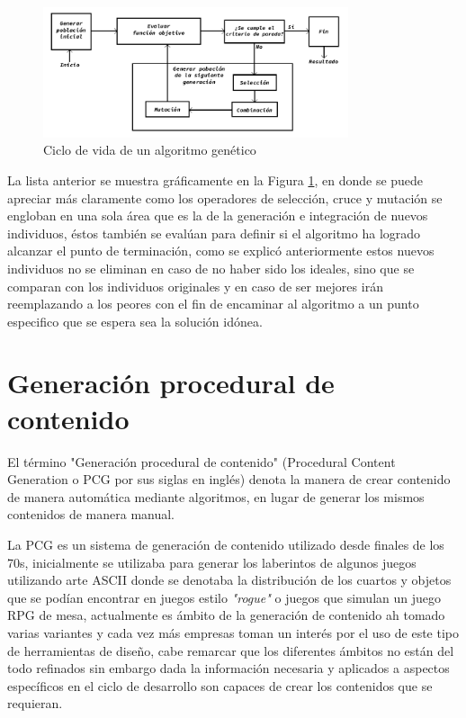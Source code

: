 \begin{figure}
    \centering
    \includegraphics[width=0.8\textwidth]{img/ga_life_cycle_es.png}
    \caption{Ciclo de vida de un algoritmo genético}
    \label{figure:GA-Cycle}
\end{figure}

La lista anterior se muestra gráficamente en la Figura \ref{figure:GA-Cycle}, en
donde se puede apreciar más claramente como los operadores de selección, cruce y
mutación se engloban en una sola área que es la de la generación e integración
de nuevos individuos, éstos  también se evalúan para definir si el algoritmo ha
logrado alcanzar el punto de terminación, como
se explicó anteriormente estos nuevos individuos no se eliminan en caso de no
haber sido los ideales, sino que se comparan con los individuos originales y en
caso de ser mejores irán reemplazando a los peores con el fin de encaminar al
algoritmo a un punto especifico que se espera sea la solución idónea.

\section{Generación procedural de contenido}
\label{section:PCG}

El término "Generación procedural de contenido" (Procedural Content Generation o
PCG por sus siglas en inglés) denota la manera de crear contenido de manera
automática mediante algoritmos, en lugar de generar los mismos contenidos de
manera manual. %


La PCG es un sistema de generación de contenido utilizado desde finales de los
70s, inicialmente se utilizaba para generar los laberintos de algunos juegos
utilizando arte ASCII donde se denotaba la distribución de los cuartos y objetos
que se podían encontrar en juegos estilo \textit{"rogue"} 
o juegos que simulan %
un juego RPG de mesa, actualmente es ámbito de la generación de contenido ah
tomado varias variantes y cada vez más empresas toman un interés por el uso de
este tipo de herramientas de diseño, cabe remarcar que los diferentes ámbitos no
están del todo refinados sin embargo dada la información necesaria y aplicados a
aspectos específicos en el ciclo de desarrollo son capaces de crear los
contenidos que se requieran.

